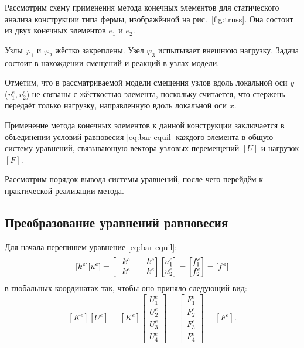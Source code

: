 \documentclass[10pt]{article}
\numberwithin{equation}{section}
\renewcommand{\phi}{\varphi}
\newcommand{\matr}[1]{[#1]}
\newcommand{\figref}[1]{рис. \ref{#1}}
\newcommand{\node}[1]{$\phi_{#1}$}
\newcommand{\element}[1]{$e_{#1}$}
\newcommand{\mm}{\llap{$-$}}
\newcommand{\phm}{\phantom{-}}
\begin{document}
Рассмотрим схему применения метода конечных элементов для статического
анализа конструкции типа фермы, изображённой на \figref{fig:truss}.
Она состоит из двух конечных элементов \element{1} и \element{2}.



Узлы \node{1} и \node{2} жёстко закреплены. Узел \node{3} испытывает
внешнюю нагрузку. Задача состоит в нахождении смещений и реакций в
узлах модели.

Отметим, что в рассматриваемой модели смещения узлов вдоль локальной
оси $y$ ($v_1^e, v_2^e$) не связаны с жёсткостью элемента, поскольку
считается, что стержень передаёт только нагрузку, направленную вдоль
локальной оси $x$.

Применение метода конечных элементов к данной конструкции заключается
в объединении условий равновесия \eqref{eq:bar-equil} каждого элемента
в общую систему уравнений, связывающую вектора узловых перемещений
$\matr{U}$ и нагрузок $\matr{F}$.

Рассмотрим порядок вывода системы уравнений, после чего перейдём к
практической реализации метода.

\subsection{Преобразование уравнений равновесия}

Для начала перепишем уравнение \eqref{eq:bar-equil}:
\begin{equation}
  \label{eq:bar-element-equil}
  \matr{k^e}\matr{u^e}=
  \begin{bmatrix}
    \phm{}k^e&& \mm k^e\\
    -k^e && k^e    
  \end{bmatrix}
  \begin{bmatrix}
    u_1^e\\
    u_2^e
  \end{bmatrix}
  =
  \begin{bmatrix}
    f_1^e\\
    f_2^e
  \end{bmatrix}=\matr{f^e}
\end{equation}
в глобальных координатах так, чтобы оно приняло следующий вид:
\begin{equation}
  \label{eq:target-equil}
  \matr{K^e}\matr{U^e}=\matr{K^e}
  \begin{bmatrix}
    U_1^e\\
    U_2^e\\
    U_3^e\\
    U_4^e
  \end{bmatrix}
  =
  \begin{bmatrix}
    F_1^e\\
    F_2^e\\
    F_3^e\\
    F_4^e
  \end{bmatrix}=\matr{F^e}.
\end{equation}
\end{document}
